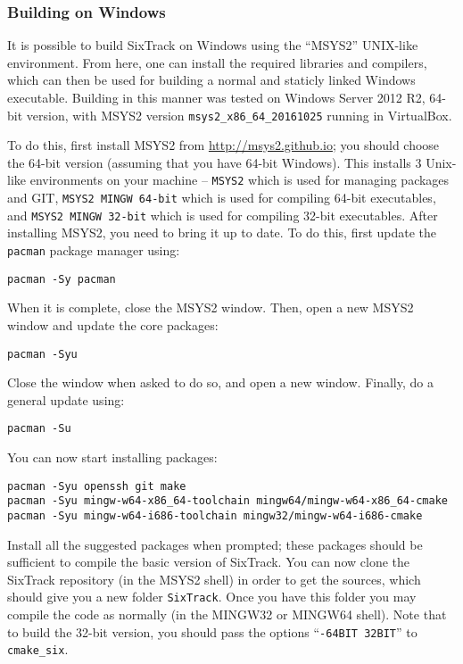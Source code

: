 \documentclass[english,BCOR=0mm,DIV=18]{scrartcl}
\begin{document}
\subsubsection{Building on Windows}

It is possible to build SixTrack on Windows using the ``MSYS2'' UNIX-like environment.
From here, one can install the required libraries and compilers, which can then be used for building a normal and staticly linked Windows executable.
Building in this manner was tested on Windows Server 2012 R2, 64-bit version, with MSYS2 version \texttt{msys2\_x86\_64\_20161025} running in VirtualBox.

To do this, first install MSYS2 from \url{http://msys2.github.io}; you should choose the 64-bit version (assuming that you have 64-bit Windows).
This installs 3 Unix-like environments on your machine -- \texttt{MSYS2} which is used for managing packages and GIT, \texttt{MSYS2 MINGW 64-bit} which is used for compiling 64-bit executables, and \texttt{MSYS2 MINGW 32-bit} which is used for compiling 32-bit executables.
After installing MSYS2, you need to bring it up to date.
To do this, first update the \texttt{pacman} package manager using:
\begin{lstlisting}
pacman -Sy pacman
\end{lstlisting}
When it is complete, close the MSYS2 window.
Then, open a new MSYS2 window and update the core packages:
\begin{lstlisting}
pacman -Syu
\end{lstlisting}
Close the window when asked to do so, and open a new window.
Finally, do a general update using:
\begin{lstlisting}
pacman -Su
\end{lstlisting}
You can now start installing packages:
\begin{lstlisting}
pacman -Syu openssh git make
pacman -Syu mingw-w64-x86_64-toolchain mingw64/mingw-w64-x86_64-cmake
pacman -Syu mingw-w64-i686-toolchain mingw32/mingw-w64-i686-cmake
\end{lstlisting}
Install all the suggested packages when prompted; these packages should be sufficient to compile the basic version of SixTrack.
You can now clone the SixTrack repository (in the MSYS2 shell) in order to get the sources, which should give you a new folder \texttt{SixTrack}.
Once you have this folder you may compile the code as normally (in the MINGW32 or MINGW64 shell).
Note that to build the 32-bit version, you should pass the options ``\texttt{-64BIT 32BIT}'' to \texttt{cmake\_six}.
\end{document}
